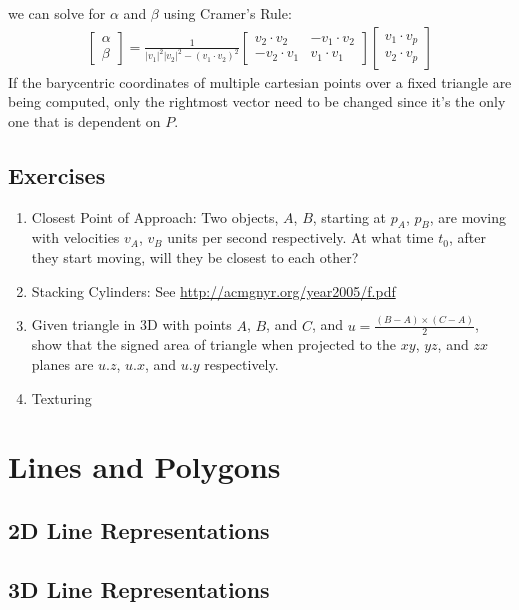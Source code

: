 \documentclass[12pt]{report}
\begin{document}
	we can solve for $\alpha$ and $\beta$ using Cramer's Rule:
	\begin{align}
	\begin{bmatrix}
	\alpha \\ \beta
	\end{bmatrix} =
	\frac{1}{|v_1|^2|v_2|^2 - (v_1 \cdot v_2)^2}
	\begin{bmatrix}
	v_2 \cdot v_2 & -v_1 \cdot v_2\\
	-v_2 \cdot v_1 & v_1 \cdot v_1
	\end{bmatrix}
	\begin{bmatrix}
	v_1 \cdot v_p \\
	v_2 \cdot v_p
	\end{bmatrix}
	\end{align}
	If the barycentric coordinates of multiple cartesian points over a fixed triangle are being computed, only the rightmost vector need to be changed since it's the only one that is dependent on $P$.
	
	
	\section{Exercises}
		\begin{enumerate}
			\item Closest Point of Approach: Two objects, $A$, $B$, starting at $p_A$, $p_B$, are moving with velocities $v_A$, $v_B$ units per second respectively. At what time $t_0$, after they start moving, will they be closest to each other?
			\item Stacking Cylinders: See \url{http://acmgnyr.org/year2005/f.pdf}
			\item Given triangle in 3D with points $A$, $B$, and $C$, and $u = \frac{(B - A)\times (C - A)}{2}$, show that the signed area of triangle when projected to the $xy$, $yz$, and $zx$ planes are $u.z$, $u.x$, and $u.y$ respectively.
			\item Texturing
		\end{enumerate}
	\chapter{Lines and Polygons}
		\section{2D Line Representations}
		\section{3D Line Representations}
\end{document}
